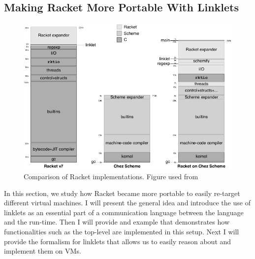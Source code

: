 
\subsection{Making Racket More Portable With Linklets}
\label{subsec:racket}

\begin{figure}[h!]
  \centering
  \includegraphics[scale=0.3]{img/racket-portable}
  \caption{Comparison of Racket implementations. Figure used
  from \cite{racket-on-chez-19}}
  \label{fig:racket-portable}
\end{figure}

In this section, we study how Racket became more portable to easily
re-target different virtual machines. I will present the general idea
and introduce the use of linklets as an essential part of a
communication language between the language and the run-time. Then I
will provide and example that demonstrates how functionalities such as
the top-level are implemented in this setup. Next I will provide the
formalism for linklets that allows us to easily reason about and
implement them on VMs.

\vspace{-0.25cm}


